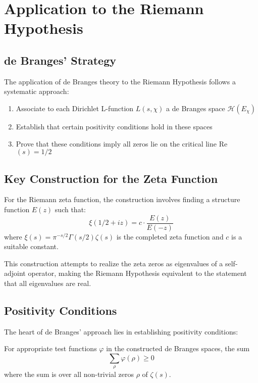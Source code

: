 \section{Application to the Riemann Hypothesis}
\label{sec:rh-application}

\subsection{de Branges' Strategy}

The application of de Branges theory to the Riemann Hypothesis follows a systematic approach:

\begin{strategy}
\begin{enumerate}
\item Associate to each Dirichlet L-function $L(s,\chi)$ a de Branges space $\mathcal{H}(E_\chi)$
\item Establish that certain positivity conditions hold in these spaces
\item Prove that these conditions imply all zeros lie on the critical line Re$(s) = 1/2$
\end{enumerate}
\end{strategy}

\subsection{Key Construction for the Zeta Function}

For the Riemann zeta function, the construction involves finding a structure function $E(z)$ such that:
$$\xi(1/2 + iz) = c \cdot \frac{E(z)}{E(-z)}$$
where $\xi(s) = \pi^{-s/2}\Gamma(s/2)\zeta(s)$ is the completed zeta function and $c$ is a suitable constant.

\begin{remark}
This construction attempts to realize the zeta zeros as eigenvalues of a self-adjoint operator, making the Riemann Hypothesis equivalent to the statement that all eigenvalues are real.
\end{remark}

\subsection{Positivity Conditions}

The heart of de Branges' approach lies in establishing positivity conditions:

\begin{conjecture}
For appropriate test functions $\varphi$ in the constructed de Branges spaces, the sum
$$\sum_{\rho} \varphi(\rho) \geq 0$$
where the sum is over all non-trivial zeros $\rho$ of $\zeta(s)$.
\end{conjecture}

